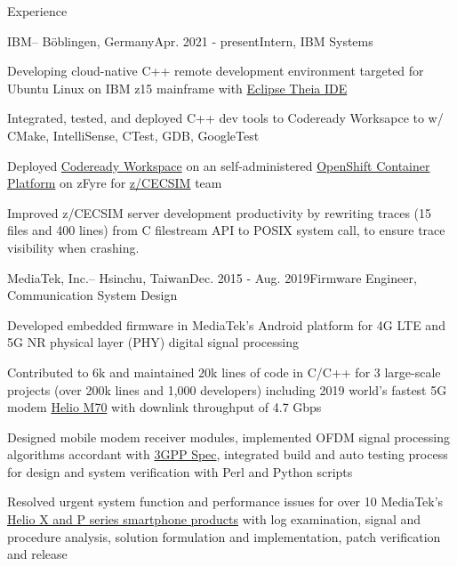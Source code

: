 \documentclass{resume} %
\begin{document}
\begin{rSection}{Experience}

\begin{rSubsection}{IBM}{--  Böblingen, Germany}{Apr. 2021 - present}{Intern, IBM Systems}
\item Developing cloud-native C++ remote development environment targeted for Ubuntu Linux on IBM z15 mainframe with \href{https://theia-ide.org/}{Eclipse Theia IDE}
\item Integrated, tested, and deployed C++ dev tools to Codeready Worksapce to w/ CMake, IntelliSense, CTest, GDB, GoogleTest
\item  Deployed \href{https://www.redhat.com/en/technologies/jboss-middleware/codeready-workspaces}{Codeready Workspace} on an self-administered \href{https://www.redhat.com/en/technologies/cloud-computing/openshift/container-platform}{OpenShift Container Platform} on zFyre for \href{https://ieeexplore.ieee.org/document/5389024}{z/CECSIM} team
\item Improved z/CECSIM server development productivity by rewriting traces (15 files and 400 lines) from C filestream API to POSIX system call, to ensure trace visibility when crashing.
\end{rSubsection}

\begin{rSubsection}{MediaTek, Inc.}{--  Hsinchu, Taiwan}{Dec. 2015 - Aug. 2019}{Firmware Engineer, Communication System Design}

\item Developed embedded firmware in MediaTek’s Android platform for 4G LTE and 5G NR physical layer (PHY) digital signal processing
\item Contributed to 6k and maintained 20k lines of code in C/C++ for 3 large-scale projects (over 200k lines and 1,000 developers) including 2019 world’s fastest 5G modem  \href{https://www.mediatek.com/blog/heres-5gs-real-speed-live-connection-demo
}{Helio M70} with downlink throughput of 4.7 Gbps
\item Designed mobile modem receiver modules, implemented OFDM signal processing algorithms accordant with  \href{https://www.3gpp.org/specifications}{3GPP Spec}, integrated build and auto testing process for design and system verification with Perl and Python scripts 
\item Resolved urgent system function and performance issues for over 10 MediaTek’s \href{https://www.mediatek.com/products/smartphones}{Helio X and P series smartphone products} with log examination, signal and procedure analysis, solution formulation and implementation, patch verification and release


\end{rSubsection}
\end{rSection}
\end{document}
